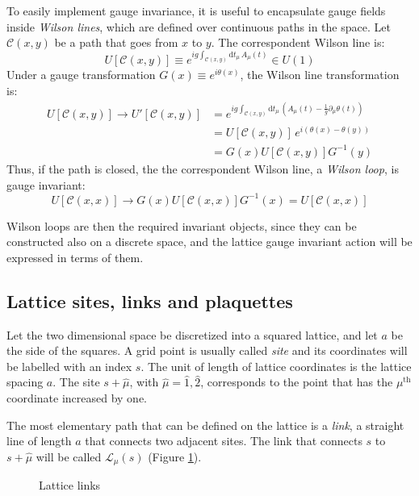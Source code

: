 To easily implement gauge invariance, it is useful to encapsulate gauge fields inside \emph{Wilson lines}, which are defined over continuous paths in the space.
Let $\mathcal C(x,y)$ be a path that goes from $x$ to $y$. The correspondent Wilson line is:
\[
    U[\mathcal C(x,y)] \equiv e^{ig\int_{\mathcal C(x,y)}\mathrm dt_\mu\,A_\mu(t)} \in U(1)
\]
Under a gauge transformation $G(x) \equiv e^{i\theta(x)}$, the Wilson line transformation is:
\begin{equation}\label{eq:path_gauge}
    \begin{aligned}
    U[\mathcal C(x,y)] \rightarrow U'[\mathcal C(x,y)] &= e^{ig\int_{\mathcal C(x,y)}\mathrm dt_\mu\,\left(A_\mu(t) - \frac{1}{g}\partial_\mu\theta(t)\right)} \\
                                                       &= U[\mathcal C(x,y)]\,e^{i(\theta(x) - \theta(y))} \\
                                                       &= G(x)U[\mathcal C(x,y)]G^{-1}(y)
    \end{aligned}
\end{equation}
Thus, if the path is closed, the the correspondent Wilson line, \ie a \emph{Wilson loop}, is gauge invariant:
\[
    U[\mathcal C(x,x)] \rightarrow G(x)U[\mathcal C(x,x)]G^{-1}(x) = U[\mathcal C(x,x)]
\]

Wilson loops are then the required invariant objects, since they can be constructed also on a discrete space,
and the lattice gauge invariant action will be expressed in terms of them.

\subsection*{Lattice sites, links and plaquettes}
Let the two dimensional space be discretized into a squared lattice, and let $a$ be the side of the squares.
A grid point is usually called \emph{site} and its coordinates will be labelled with an index $s$.
The unit of length of lattice coordinates is the lattice spacing $a$.
The site $s + \hat\mu$, with $\hat\mu = \hat1,\hat2$, corresponds to the point that has the $\mu^\mathrm{th}$ coordinate increased by one.

The most elementary path that can be defined on the lattice is a \emph{link},
\ie a straight line of length $a$ that connects two adjacent sites.
The link that connects $s$ to $s+\hat\mu$ will be called $\mathcal L_\mu(s)$ (Figure \ref{fig:links}).
\begin{figure}[!htb]
    \centering
    \caption{Lattice links}
    \label{fig:links}
\end{figure}

